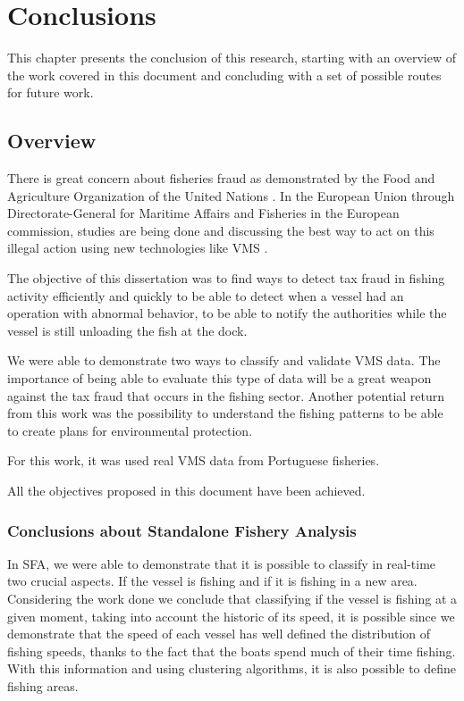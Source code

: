 % 
%  
%
\chapter{Conclusions}
\label{cha:conclusion}


This chapter presents the conclusion of this research, starting with an overview of the work covered in this document and concluding with a set of possible routes for future work.

\section{Overview} %
\label{sec:overview}

There is great concern about fisheries fraud as demonstrated by the Food and Agriculture Organization of the United Nations \cite{FAOFraud}.
In the European Union through Directorate-General for Maritime Affairs and Fisheries in the European commission, studies are being done and discussing the best way to act on this illegal action using new technologies like VMS \cite{WEBSITE:ECControl}.

The objective of this dissertation was to find ways to detect tax fraud in fishing activity efficiently and quickly to be able to detect when a vessel had an operation with abnormal behavior, to be able to notify the authorities while the vessel is still unloading the fish at the dock.

We were able to demonstrate two ways to classify and validate VMS data. The importance of being able to evaluate this type of data will be a great weapon against the tax fraud that occurs in the fishing sector. Another potential return from this work was the possibility to understand the fishing patterns to be able to create plans for environmental protection.

For this work, it was used real VMS data from Portuguese fisheries.

All the objectives proposed in this document have been achieved.

\subsection{Conclusions about Standalone Fishery Analysis} %
\label{sec:con_sfa}

In SFA, we were able to demonstrate that it is possible to classify in real-time two crucial aspects. If the vessel is fishing and if it is fishing in a new area.\\
Considering the work done we conclude that classifying if the vessel is fishing at a given moment, taking into account  the historic of its speed, it is possible since we demonstrate that the speed of each vessel has well defined the distribution of fishing speeds, thanks to the fact that the boats spend much of their time fishing.
With this information and using clustering algorithms, it is also possible to define fishing areas.\\

